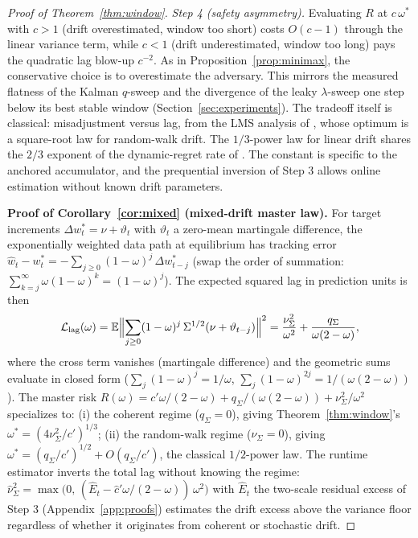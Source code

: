\begin{proof}[Proof of Theorem~\ref{thm:window}]
\emph{Step 4 (safety asymmetry).}
Evaluating $R$ at $c\,\omega^*$ with $c > 1$ (drift overestimated, window too short) costs $O(c - 1)$ through the linear variance term, while $c < 1$ (drift underestimated, window too long) pays the quadratic lag blow-up $c^{-2}$.
As in Proposition~\ref{prop:minimax}, the conservative choice is to overestimate the adversary.
This mirrors the measured flatness of the Kalman $q$-sweep and the divergence of the leaky $\lambda$-sweep one step below its best stable window (Section~\ref{sec:experiments}).
The tradeoff itself is classical: misadjustment versus lag, from the LMS analysis of \citet{widrow1976}, whose optimum is a square-root law for random-walk drift. The $1/3$-power law for linear drift shares the $2/3$ exponent of the dynamic-regret rate of \citet{besbes2015}. The constant is specific to the anchored accumulator, and the prequential inversion of Step 3 allows online estimation without known drift parameters.

\medskip
\noindent\textbf{Proof of Corollary~\ref{cor:mixed} (mixed-drift master law).}
For target increments $\Delta w^*_t = \nu + \vartheta_t$ with $\vartheta_t$ a zero-mean martingale difference, the exponentially weighted data path at equilibrium has tracking error $\widehat w_t - w^*_t = -\sum_{j \ge 0}(1-\omega)^j\,\Delta w^*_{t-j}$ (swap the order of summation: $\sum_{k=j}^{\infty} \omega(1-\omega)^k = (1-\omega)^j$).
The expected squared lag in prediction units is then
\[
  \mathcal{L}_{\mathrm{lag}}(\omega) = \mathbb{E}\Bigl\|\sum_{j \ge 0}(1-\omega)^j\,\Sigma^{1/2}(\nu + \vartheta_{t-j})\Bigr\|^2
  = \frac{\nu^2_\Sigma}{\omega^2} + \frac{q_\Sigma}{\omega(2-\omega)},
\]
where the cross term vanishes (martingale difference) and the geometric sums evaluate in closed form ($\sum_j (1-\omega)^j = 1/\omega$, $\sum_j (1-\omega)^{2j} = 1/(\omega(2-\omega))$).
The master risk $R(\omega) = c' \omega/(2-\omega) + q_\Sigma/(\omega(2-\omega)) + \nu^2_\Sigma/\omega^2$ specializes to: (i) the coherent regime ($q_\Sigma = 0$), giving Theorem~\ref{thm:window}'s $\omega^* = (4\nu^2_\Sigma/c')^{1/3}$; (ii) the random-walk regime ($\nu_\Sigma = 0$), giving $\omega^* = (q_\Sigma/c')^{1/2} + O(q_\Sigma/c')$, the classical $1/2$-power law.
The runtime estimator inverts the total lag without knowing the regime: $\widehat\nu^2_\Sigma = \max\bigl(0,\,(\widehat E_t - \hat c' \omega/(2-\omega))\,\omega^2\bigr)$ with $\widehat E_t$ the two-scale residual excess of Step 3 (Appendix~\ref{app:proofs}) estimates the drift excess above the variance floor regardless of whether it originates from coherent or stochastic drift.


\end{proof}

